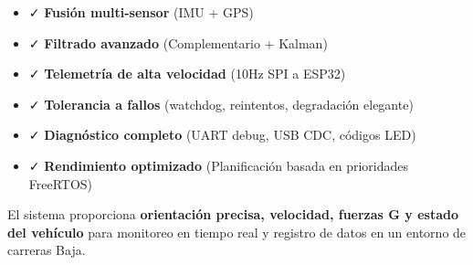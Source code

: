 \documentclass[11pt,a4paper]{article}
\begin{document}
\begin{itemize}
    \item ✓ \textbf{Fusión multi-sensor} (IMU + GPS)
    \item ✓ \textbf{Filtrado avanzado} (Complementario + Kalman)
    \item ✓ \textbf{Telemetría de alta velocidad} (10Hz SPI a ESP32)
    \item ✓ \textbf{Tolerancia a fallos} (watchdog, reintentos, degradación elegante)
    \item ✓ \textbf{Diagnóstico completo} (UART debug, USB CDC, códigos LED)
    \item ✓ \textbf{Rendimiento optimizado} (Planificación basada en prioridades FreeRTOS)
\end{itemize}

El sistema proporciona \textbf{orientación precisa, velocidad, fuerzas G y estado del vehículo} para monitoreo en tiempo real y registro de datos en un entorno de carreras Baja.
\end{document}
